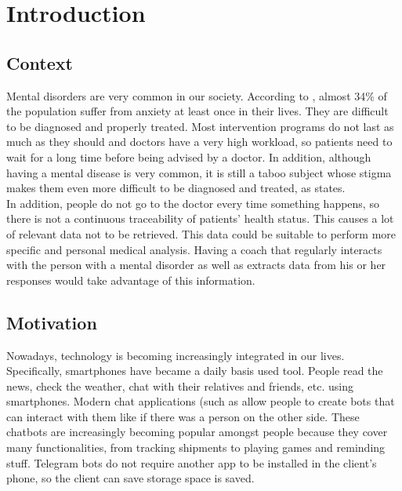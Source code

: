 \documentclass[12pt,english]{article}
\begin{document}


\thispagestyle{empty}
\newpage
\tableofcontents{}
\newpage

\section{Introduction}

\subsection{Context}

Mental disorders are very common in our society. According to \cite{Bandelow2015}, almost 34\% of the population suffer from anxiety at least once in their lives. They are difficult to be diagnosed and properly treated. Most intervention programs do not last as much as they should and doctors have a very high workload, so patients need to wait for a long time before being advised by a doctor. In addition, although having a mental disease is very common, it is still a taboo subject whose stigma makes them even more difficult to be diagnosed and treated, as \cite{Davies2000} states.\\

In addition, people do not go to the doctor every time something happens, so there is not a continuous traceability of patients' health status. This causes a lot of relevant data not to be retrieved. This data could be suitable to perform more specific and personal medical analysis. Having a coach that regularly interacts with the person with a mental disorder as well as extracts data from his or her responses would take advantage of this information.


\subsection{Motivation}

Nowadays, technology is becoming increasingly integrated in our lives. Specifically, smartphones have became a daily basis used tool. People read the news, check the weather, chat with their relatives and friends, etc. using smartphones. Modern chat applications (such as \cite{Telegram} allow people to create bots that can interact with them like if there was a person on the other side. These chatbots are increasingly becoming popular amongst people because they cover many functionalities, from tracking shipments to playing games and reminding stuff. Telegram bots do not require another app to be installed in the client's phone, so the client can save storage space is saved.\\
\end{document}
